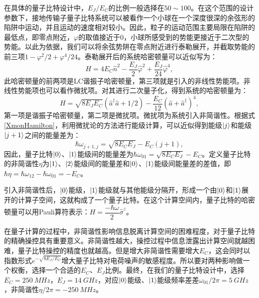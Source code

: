在具体的量子比特设计中，$ E_{J}/E_{C}$的比例一般选择在$50\sim100$。在这个范围的设计参数下，接地传输子量子比特系统可以被看作一个小球在一个深度很深的余弦形的陷阱中运动，并且运动的速度相对较小。因此，粒子的运动范围主要局限在陷阱的最低点，即零点附近，$\varphi$的取值接近于0，小球所感受到的势能更接近于二次型的势能。以此为依据，我们可以将余弦势阱在零点附近进行泰勒展开，并截取势能的前三项$ 1-\varphi^{2}/2+\varphi^{4}/24$。泰勒展开后的系统哈密顿量可以近似写为：
\begin{equation}
	H = 4E_{C}\hat{n}^{2}-\dfrac{E_{J}}{2}\hat{\varphi}^{2}+\dfrac{E_{J}}{24}\hat{\varphi}^{4},
\end{equation}
此哈密顿量的前两项是LC谐振子哈密顿量，第三项就是引入的非线性势能项。非线性势能项也可以看作微扰项。对其进行二次量子化，得到系统的哈密顿量为：
\begin{equation}\label{XmonHamilton}
	H = \sqrt{8E_{J}E_{C}}\left( \hat{a}^{\dagger}\hat{a}+1/2 \right)-\frac{E_{C}}{12}\left( \hat{a}+\hat{a}^{\dagger}\right)^{4},
\end{equation}
第一项是谐振子哈密顿量，第二项是微扰项。微扰项为系统引入非简谐性。根据式\ref{XmonHamilton}，利用微扰论的方法进行能级计算，可以近似得到能级$ \left|j\right>$和能级$ \left|j+1\right>$之间的能量差为：
\begin{equation}
	\hbar\omega_{j+1,j} = \sqrt{8E_{C}E_{J}}-E_{C}\left( j+1 \right),
\end{equation}
因此，量子比特$\left|0\right>$、$ \left|1\right>$能级间的能量差为$ \hbar\omega_{01} = \sqrt{8E_{C}E_{J}}-E_{C}$。定义量子比特的非简谐性$ \eta$为$ \left|1\right>$、$\left|2\right>$能级间的能量差和$\left|0\right>$、$\left|1\right>$能级间能量差的差值，即$\hbar\eta=\hbar\omega_{12}-\hbar\omega_{01}=-E_{C}$。

引入非简谐性后，$ \left|0\right>$能级，$ \left|1\right>$能级就与其他能级分隔开，形成一个由$ \left|0\right>$和$\left|1\right>$展开的计算子空间，这就构成了一个量子比特。在这个计算空间内，量子比特的哈密顿量可以用Pauli算符表示：$ H = \dfrac{-\hbar\omega}{2}\hat{\sigma}^{z}$。

在量子计算的过程中，非简谐性影响信息脱离计算空间的困难程度，对于量子比特的精确操控具有重要意义。非简谐性越大，操控过程中信息泄露出计算空间就越困难，量子比特操控的精度也就越高。但是增大非简谐性需要增大$ E_{C}$，这会同时以指数形式$ {e}^{-\sqrt{8E_{J}/E_{C}}}$增大量子比特对电荷噪声的敏感程度。所以要对两种影响做一个权衡，选择一个合适的$ E_{C}$、$ E_{J}$比例。最终，在我们的量子比特设计中，选择$ E_{C}=250 \  {MHz}$，$ E_{J}=14 \ {GHz}$，对应$ \left|0\right>$能级、$ \left|1\right>$能级频率差差$ \omega_{01}/2\pi=5 \ {GHz}$，非简谐性$ \eta/2\pi = -250\ {MHz}$。

